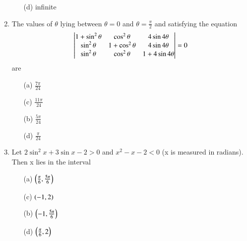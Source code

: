 \documentclass[journal,12pt,twocolumn,article]{IEEEtran}
\theoremstyle{remark}
\begin{document}
\begin{enumerate}
\begin{multicols}{2}
\begin{enumerate}
\item[(d)] infinite
\end{enumerate}
\end{multicols}
\item The values of $\theta$ lying between $\theta = 0$ and $\theta = \frac{\pi}{2}$ and satisfying the equation
\[\begin{vmatrix}
$$1+\sin^2\theta$$ & $$\cos^2\theta$$ & $$4\sin4\theta$$\\
$$\sin^2\theta$$ & $$1+\cos^2\theta$$ & $$4\sin4\theta$$\\
$$\sin^2\theta$$ & $$\cos^2\theta$$ & $$1+4\sin4\theta$$
\end{vmatrix} = 0\] are
\hfill{}
\begin{multicols}{2}
\begin{enumerate}
\item[(a)] $\frac{7\pi}{24}$
\item[(c)] $\frac{11\pi}{24}$
\columnbreak
\item[(b)] $\frac{5\pi}{24}$
\item[(d)] $\frac{\pi}{24}$
\end{enumerate}
\end{multicols}
\item Let $2\sin^2x+3\sin x-2>0$ and $x^2-x-2<0$ (x is measured in radians). Then x lies in the interval
\hfill{}
\begin{multicols}{2}
\begin{enumerate}
\item[(a)] $\left(\frac{\pi}{6},\frac{5\pi}{6}\right)$
\item[(c)] $\left(-1,2\right)$
\columnbreak
\item[(b)] $\left(-1,\frac{5\pi}{6}\right)$
\item[(d)] $\left(\frac{\pi}{6},2\right)$
\end{enumerate}
\end{multicols}
\end{enumerate}
\end{document}
